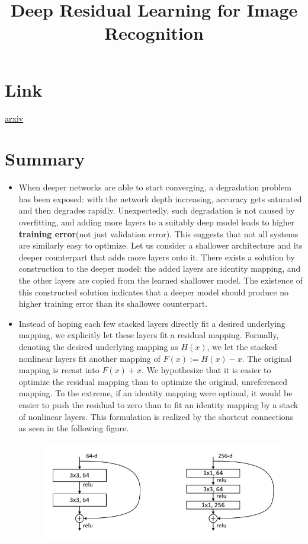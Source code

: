 \documentclass{article}
\title{Deep Residual Learning for Image Recognition}
\author{}
\date{}
\begin{document}
\maketitle

\section*{Link}
\href{https://arxiv.org/abs/1512.03385}{arxiv} 

\section*{Summary}
\begin{itemize}
    \item When deeper networks are able to start converging, a degradation problem has been exposed: with the network depth increasing, accuracy gets saturated and then degrades rapidly. Unexpectedly, such degradation is not caused by overfitting, and adding more layers to a suitably deep model leads to higher \textbf{training error}(not just validation error). This suggests that not all systems are similarly easy to optimize. Let us consider a shallower architecture and its deeper counterpart that adds more layers onto it. There exists a solution by construction to the deeper model: the added layers are identity mapping, and the other layers are copied from the learned shallower model. The existence of this constructed solution indicates that a deeper model should produce no higher training error than its shallower counterpart. 
    \item Instead of hoping each few stacked layers directly fit a desired underlying mapping, we explicitly let these layers fit a residual mapping. Formally, denoting the desired underlying mapping as $H(x)$, we let the stacked nonlinear layers fit another mapping of $F(x) := H(x) - x$. The original mapping is recast into $F(x) + x$. We hypothesize that it is easier to optimize the residual mapping than to optimize the original, unreferenced mapping. To the extreme, if an identity mapping were optimal, it would be easier to push the residual to zero than to fit an identity mapping by a stack of nonlinear layers. This formulation is realized by the shortcut connections as seen in the following figure.
    \begin{figure}[H]
        \centering
        \includegraphics[scale=0.75]{residual_block.png}

\end{figure}
\end{itemize}
\end{document}
